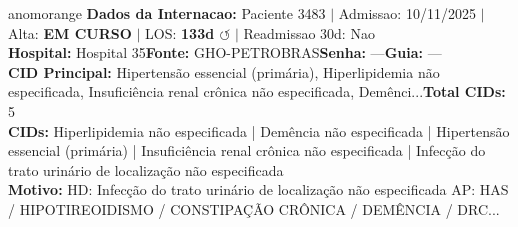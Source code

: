 \documentclass[a4paper,10pt]{article}
\begin{document}
\begin{anomalycard}[Internacao 154566 | GHO-PETROBRAS | ALTO (z=3.84)]{anomorange}
\textbf{Dados da Internacao:} Paciente 3483 $\mid$ Admissao: 10/11/2025 $\mid$ Alta: \textcolor{anomorange}{\textbf{EM CURSO}} $\mid$ LOS: \textbf{133d \textcolor{anomorange}{$\circlearrowleft$}} $\mid$ Readmissao 30d: Nao\\
\textbf{Hospital:} Hospital 35\quad\textbf{Fonte:} GHO-PETROBRAS\quad\textbf{Senha:} ---\quad\textbf{Guia:} ---\\
\textbf{CID Principal:} {\small Hipertensão essencial (primária), Hiperlipidemia não especificada, Insuficiência renal crônica não especificada, Demênci...}\quad\textbf{Total CIDs:} 5\\

\textbf{CIDs:} {\scriptsize Hiperlipidemia não especificada | Demência não especificada | Hipertensão essencial (primária) | Insuficiência renal crônica não especificada | Infecção do trato urinário de localização não especificada}\\

\textbf{Motivo:} {\scriptsize HD: Infecção do trato urinário de localização não especificada  AP: HAS / HIPOTIREOIDISMO / CONSTIPAÇÃO CRÔNICA / DEMÊNCIA / DRC...}\\


\end{anomalycard}
\end{document}
